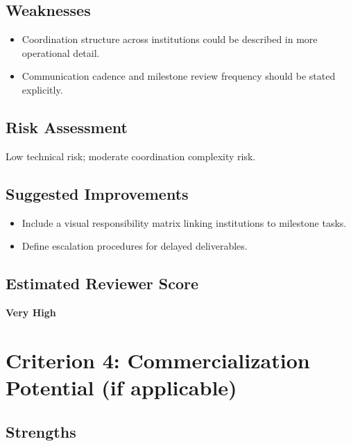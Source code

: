 \documentclass[11pt]{article}
\begin{document}
\subsection*{Weaknesses}

\begin{itemize}[leftmargin=1.5em]

\item Coordination structure across institutions could be described in more operational detail.

\item Communication cadence and milestone review frequency should be stated explicitly.

\end{itemize}

\subsection*{Risk Assessment}

Low technical risk; moderate coordination complexity risk.

\subsection*{Suggested Improvements}

\begin{itemize}[leftmargin=1.5em]

\item Include a visual responsibility matrix linking institutions to milestone tasks.

\item Define escalation procedures for delayed deliverables.

\end{itemize}

\subsection*{Estimated Reviewer Score}

\textbf{Very High}

\section*{Criterion 4: Commercialization Potential (if applicable)}

\subsection*{Strengths}
\end{document}
